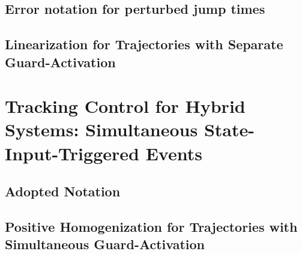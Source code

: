 \documentclass[../DC2017114Bouma.tex]{subfiles}
\begin{document}
\section{Error notation for perturbed jump times}
\section{Linearization for Trajectories with Separate Guard-Activation}

\cleartooddpage
\chapter{Tracking Control for Hybrid Systems: Simultaneous State-Input-Triggered Events}\label{ch:simult}
\cite{Rijnen2018}
\section{Adopted Notation}
\section{Positive Homogenization for Trajectories with Simultaneous Guard-Activation}
\end{document}
